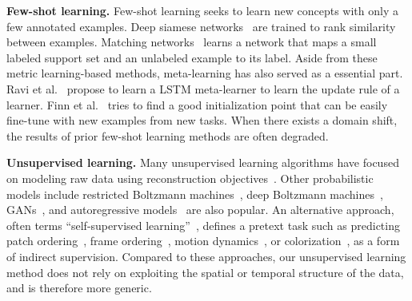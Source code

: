 \textbf{Few-shot learning.}
Few-shot learning seeks to learn new concepts with only a few annotated examples. Deep siamese networks~\cite{koch2015siamese} are trained to rank similarity between examples. Matching networks~\cite{vinyals2016matching} learns a network that maps a small labeled support set and an unlabeled example to its label. Aside from these metric learning-based methods, meta-learning has also served as a essential part. Ravi et al.~\cite{ravi2017optimization} propose to learn a LSTM meta-learner to learn the update rule of a learner. Finn et al.~\cite{finn2017model} tries to find a good initialization point that can be easily fine-tune with new examples from new tasks. When there exists a domain shift, the results of prior few-shot learning methods are often degraded.

\textbf{Unsupervised learning.}
Many unsupervised learning algorithms have focused on
modeling raw data using reconstruction objectives~\cite{hinton2006reducing,vincent2008extracting,kingma2013auto}. Other probabilistic models include restricted Boltzmann machines~\cite{hinton1986learning}, deep Boltzmann machines~\cite{salakhutdinov2009deep}, GANs~\cite{goodfellow2014generative,dumoulin2016adversarially,donahue2016adversarial}, and autoregressive models~\cite{oord2016pixel,van2016conditional} are also popular. 
An alternative approach, often terms ``self-supervised learning''~\cite{de1994learning}, defines a pretext task such as predicting patch ordering~\cite{doersch2015unsupervised}, frame ordering~\cite{misra2016shuffle}, motion dynamics~\cite{luo2017unsupervised}, or colorization~\cite{zhang2016colorful}, as a form of indirect supervision. Compared to these approaches, our unsupervised learning method does not rely on exploiting the spatial or temporal structure of the data, and is therefore more generic.



